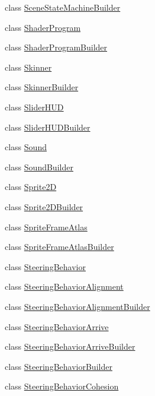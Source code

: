 \begin{DoxyCompactItemize}
\item 
class \mbox{\hyperlink{classnjli_1_1_scene_state_machine_builder}{Scene\+State\+Machine\+Builder}}
\item 
class \mbox{\hyperlink{classnjli_1_1_shader_program}{Shader\+Program}}
\item 
class \mbox{\hyperlink{classnjli_1_1_shader_program_builder}{Shader\+Program\+Builder}}
\item 
class \mbox{\hyperlink{classnjli_1_1_skinner}{Skinner}}
\item 
class \mbox{\hyperlink{classnjli_1_1_skinner_builder}{Skinner\+Builder}}
\item 
class \mbox{\hyperlink{classnjli_1_1_slider_h_u_d}{Slider\+H\+UD}}
\item 
class \mbox{\hyperlink{classnjli_1_1_slider_h_u_d_builder}{Slider\+H\+U\+D\+Builder}}
\item 
class \mbox{\hyperlink{classnjli_1_1_sound}{Sound}}
\item 
class \mbox{\hyperlink{classnjli_1_1_sound_builder}{Sound\+Builder}}
\item 
class \mbox{\hyperlink{classnjli_1_1_sprite2_d}{Sprite2D}}
\item 
class \mbox{\hyperlink{classnjli_1_1_sprite2_d_builder}{Sprite2\+D\+Builder}}
\item 
class \mbox{\hyperlink{classnjli_1_1_sprite_frame_atlas}{Sprite\+Frame\+Atlas}}
\item 
class \mbox{\hyperlink{classnjli_1_1_sprite_frame_atlas_builder}{Sprite\+Frame\+Atlas\+Builder}}
\item 
class \mbox{\hyperlink{classnjli_1_1_steering_behavior}{Steering\+Behavior}}
\item 
class \mbox{\hyperlink{classnjli_1_1_steering_behavior_alignment}{Steering\+Behavior\+Alignment}}
\item 
class \mbox{\hyperlink{classnjli_1_1_steering_behavior_alignment_builder}{Steering\+Behavior\+Alignment\+Builder}}
\item 
class \mbox{\hyperlink{classnjli_1_1_steering_behavior_arrive}{Steering\+Behavior\+Arrive}}
\item 
class \mbox{\hyperlink{classnjli_1_1_steering_behavior_arrive_builder}{Steering\+Behavior\+Arrive\+Builder}}
\item 
class \mbox{\hyperlink{classnjli_1_1_steering_behavior_builder}{Steering\+Behavior\+Builder}}
\item 
class \mbox{\hyperlink{classnjli_1_1_steering_behavior_cohesion}{Steering\+Behavior\+Cohesion}}
\item 

\end{DoxyCompactItemize}
